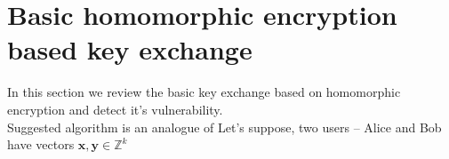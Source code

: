 \section{Basic homomorphic encryption based key exchange}
	In this section we review the basic key exchange based on homomorphic encryption and detect it's vulnerability. \\
	Suggested algorithm is an analogue of 
	Let's suppose, two users -- Alice and Bob have vectors $ \textbf{x}, \textbf{y} \in \mathbb{Z}^k $